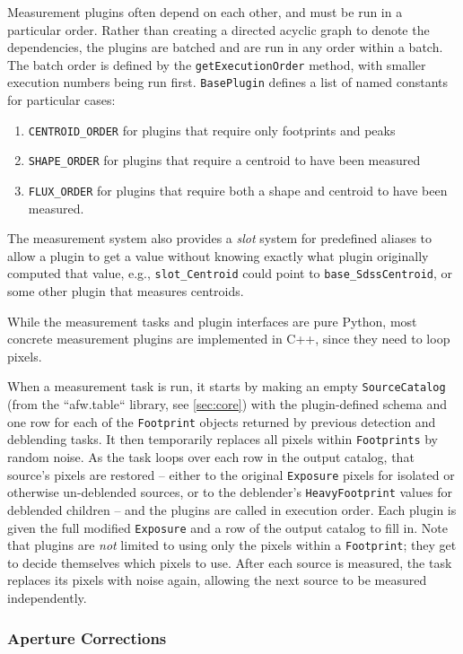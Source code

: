 Measurement plugins often depend on each other, and must be run in a particular order.
Rather than creating a directed acyclic graph to denote the dependencies, the plugins are batched and are run in any order within a batch.
The batch order is defined by the \texttt{getExecutionOrder} method, with smaller execution numbers being run first.
\texttt{BasePlugin} defines a list of named constants for particular cases:
\begin{enumerate}
    \item \texttt{CENTROID\_ORDER} for plugins that require only footprints and peaks
    \item \texttt{SHAPE\_ORDER} for plugins that require a centroid to have been measured
    \item \texttt{FLUX\_ORDER} for plugins that require both a shape and centroid to have been measured.
\end{enumerate}
The measurement system also provides a \textit{slot} system for predefined aliases to allow a plugin to get a value without knowing exactly what plugin originally computed that value, e.g., \texttt{slot\_Centroid} could point to \texttt{base\_SdssCentroid}, or some other plugin that measures centroids.

While the measurement tasks and plugin interfaces are pure Python, most concrete measurement plugins are implemented in C++, since they need to loop pixels.

When a measurement task is run, it starts by making an empty
\texttt{SourceCatalog} (from the ``afw.table`` library, see \ref{sec:core}) with the plugin-defined schema and one row for each of the \texttt{Footprint} objects returned by previous detection and deblending tasks.
It then temporarily replaces all pixels within \texttt{Footprints} by random noise.
As the task loops over each row in the output catalog, that source's pixels are restored -- either to the original \texttt{Exposure} pixels for isolated or otherwise un-deblended sources, or to the deblender's \texttt{HeavyFootprint} values for deblended children -- and the plugins are called in execution order.
Each plugin is given the full modified \texttt{Exposure} and a row of the output catalog to fill in.
Note that plugins are \emph{not} limited to using only the pixels within a \texttt{Footprint}; they get to decide themselves which pixels to use.
After each source is measured, the task replaces its pixels with noise again, allowing the next source to be measured independently.

\subsubsection{Aperture Corrections}
\label{sec:apcorr}

